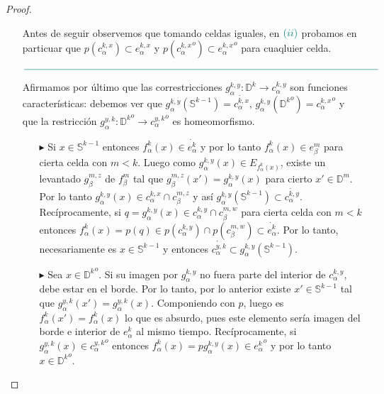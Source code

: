\documentclass[11pt]{article}
\newcommand{\D}{\mathbb{D}}
\newcommand{\Ss}{\mathbb{S}}
\newcommand{\tint}[1]{#1^o}%
\newcommand{\paint}[2]{\color{#1}{#2}}
\begin{document}
\begin{proof}
\begin{itemize}
\item[]Antes de seguir observemos que tomando celdas iguales, en $\paint{grey-light-blue}{(ii)}$ probamos en particuar que $p(c_\alpha^{k,x}) \subset e_\alpha^{k,x}$ y $p(\tint{{c_\alpha^{k,x}}}) \subset \tint{{e_\alpha^{k,x}}}$ para cuaqluier celda.

\begin{center}
$\paint{grey-light-blue}{
\rule{400pt}{0.5pt}
}$
\end{center}

\item[\paint{grey-light-blue}{(iii)}] Afirmamos por \'ultimo que las correstricciones $g_\alpha^{k,y} : \D^k \to c_\alpha^{k,y}$ son funciones caracter\'isticas: debemos ver que $g_\alpha^{k,y}(\Ss^{k-1}) = \dot{c_\alpha^{k,x}}$, $g_\alpha^{k,y}(\tint{{\D^k}}) = \tint{{c_\alpha^{k,x}}}$ y que la restricci\'on $g_\alpha^{y,k} : \tint{{\D^k}} \to \tint{{c_\alpha^{y,k}}}$ es homeomorfismo.
\begin{itemize}
\item[$\blacktriangleright$] Si $x \in \Ss^{k-1}$ entonces $f_\alpha^k(x) \in \dot{e_\alpha^k}$ y por lo tanto $f_\alpha^k(x) \in e_\beta^m$ para cierta celda con $m < k$. Luego como $g_\alpha^{k,y}(x) \in E_{f_\alpha^k(x)}$, existe un levantado $g_\beta^{m,z}$ de $f_\beta^m$ tal que $g_\beta^{m,z}(x') = g_\alpha^{k,y}(x)$ para cierto $x' \in \D^{m}$. Por lo tanto $g_\alpha^{k,y}(x) \in c_\alpha^{k,x} \cap c_\beta^{m,z}$ y as\'i $g_\alpha^{k,y}(\Ss^{k-1}) \subset \dot{c_\alpha^{k,y}}$. Rec\'iprocamente, si $q = g_\alpha^{k,y}(x) \in c_\alpha^{k,y} \cap c_\beta^{m,w}$ para cierta celda con $m < k$ entonces $f_\alpha^k(x) = p(q) \in p(c_\alpha^{k,y}) \cap p(c_\beta^{m,w}) \subset \dot{e_\alpha^k}$. Por lo tanto, necesariamente es $x \in \Ss^{k-1}$ y entonces $\dot{c_\alpha^{y,k}} \subset g_\alpha^{k,y}(\Ss^{k-1})$.
\item[$\blacktriangleright$] Sea $x \in \tint{{\D^k}}$. Si su imagen por $g_\alpha^{k,y}$ no fuera parte del interior de $c_\alpha^{k,y}$, debe estar en el borde. Por lo tanto, por lo anterior existe $x' \in \Ss^{k-1}$ tal que $g_\alpha^{y,k}(x') = g_\alpha^{y,k}(x)$. Componiendo con $p$, luego es $f_\alpha^{k}(x') = f_\alpha^{k}(x)$ lo que es absurdo, pues este elemento ser\'ia imagen del borde e interior de $e_\alpha^k$ al mismo tiempo. Rec\'iprocamente, si $g_\alpha^{y,k}(x) \in \tint{{c_\alpha^{y,k}}}$ entonces $f_\alpha^k(x) = pg_\alpha^{k,y}(x) \in \tint{{e_\alpha^k}}$ y por lo tanto $x \in \tint{{\D^k}}$.

\end{itemize}
\end{itemize}
\end{proof}
\end{document}
